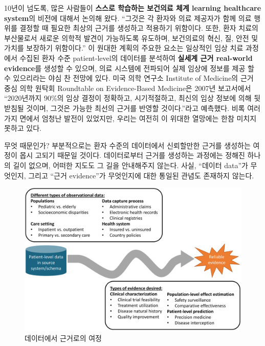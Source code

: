\documentclass[10.5pt]{book}
\theoremstyle{definition}
\theoremstyle{definition}
\theoremstyle{definition}
\theoremstyle{remark}
\begin{document}
10년이 넘도록, 많은 사람들이 \textbf{스스로 학습하는 보건의료 체계
learning healthcare system}의 비전에 대해서 논의해 왔다. ``그것은 각
환자와 의료 제공자가 함께 의료 행위를 결정할 때 필요한 최상의 근거를
생성하고 적용하기 위함이다. 또한, 환자 치료의 부산물로서 새로운 의학적
발견이 가능하도록 유도하며, 보건의료의 혁신, 질, 안전 및 가치를 보장하기
위함이다.'' \citep{olsen2007learning} 이 원대한 계획의 주요한 요소는
일상적인 임상 치료 과정에서 수집된 환자 수준 patient-level의 데이터를
분석하여 \textbf{실세계 근거 real-world evidence}를 생성할 수 있으며,
의료 시스템에 전파되어 실제 임상에 정보를 제공 할 수 있으리라는 야심 찬
전망에 있다. 미국 의학 연구소 Institute of Medicine의 근거 중심 의학
원탁회 Roundtable on Evidence-Based Medicine은 2007년 보고서에서
``2020년까지 90\%의 임상 결정이 정확하고, 시기적절하고, 최신의 임상
정보에 의해 뒷받침될 것이며, 그것은 가능한 최선의 근거를 반영할
것이다.''라고 예측했다. \citep{olsen2007learning} 비록 여러 가지 면에서
엄청난 발전이 있었지만, 우리는 여전히 이 위대한 열망에는 한참 미치지
못하고 있다.

무엇 때문인가? 부분적으로는 환자 수준의 데이터에서 신뢰할만한 근거를
생성하는 여정이 몹시 고되기 때문일 것이다. 데이터로부터 근거를 생성하는
과정에는 정해진 하나의 길이 없으며, 어떠한 지도도 그 길을 안내해주지
않는다. 사실, ``데이터 data''가 무엇인지, 그리고 ``근거 evidence''가
무엇인지에 대한 통일된 관념도 존재하지 않는다.

\begin{figure}

{\centering \includegraphics[width=1\linewidth]{images/OhdsiCommunity/datajourney} 

}

\caption{데이터에서 근거로의 여정}\label{fig:datajourney}
\end{figure}
\end{document}
